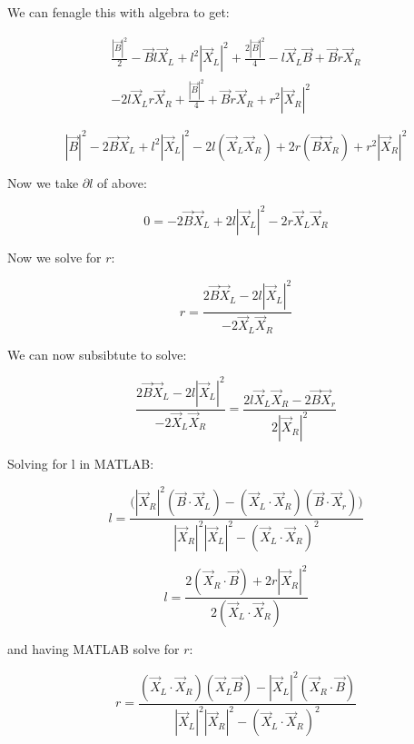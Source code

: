 \documentclass{article}
\begin{document}
\noindent We can fenagle this with algebra to get:

\begin{equation}
    \begin{split}
        \frac{|\vec{B}|^2}{2} - \vec{B}l\vec{X}_L + l^2|\vec{X}_L|^2+\frac{2|\vec{B}|^2}{4} - l\vec{X}_L\vec{B}+\vec{B}r\vec{X}_R \\
        - 2l\vec{X}_Lr\vec{X}_R+\frac{|\vec{B}|^2}{4}+\vec{B}r\vec{X}_R+r^2|\vec{X}_R|^2
    \end{split}
\end{equation}

\begin{equation}
    |\vec{B}|^2-2\vec{B}\vec{X}_L+l^2|\vec{X}_L|^2-2l(\vec{X}_L\vec{X}_R)+2r(\vec{B}\vec{X}_R)+r^2|\vec{X}_R|^2
\end{equation}

\noindent Now we take $\partial l$ of above:

\begin{equation}
    0 = -2\vec{B}\vec{X}_L+2l|\vec{X}_L|^2-2r\vec{X}_L\vec{X}_R
\end{equation}

\noindent Now we solve for $r$:

\begin{equation}
    r = \frac{2\vec{B}\vec{X}_L-2l|\vec{X}_L|^2}{-2\vec{X}_L\vec{X}_R}
\end{equation}

\noindent We can now subsibtute to solve:

\begin{equation}
    \frac{2\vec{B}\vec{X}_L-2l|\vec{X}_L|^2}{-2\vec{X}_L\vec{X}_R} = \frac{2l\vec{X}_L\vec{X}_R-2\vec{B}\vec{X}_r}{2|\vec{X}_R|^2}
\end{equation}

\noindent Solving for l in MATLAB:

\begin{equation}
    l = \frac{\bigl(|\vec{X}_R|^2(\vec{B}\cdot\vec{X}_L)-(\vec{X}_L\cdot\vec{X}_R)(\vec{B}\cdot\vec{X}_r)\bigr)}{|\vec{X}_R|^2|\vec{X}_L|^2-(\vec{X}_L\cdot\vec{X}_R)^2}
\end{equation}

\begin{equation}
    l = \frac{2(\vec{X}_R\cdot\vec{B})+2r|\vec{X}_R|^2}{2(\vec{X}_L\cdot\vec{X}_R)}
\end{equation}

\noindent and having MATLAB solve for $r$:

\begin{equation}
    r = \frac{(\vec{X}_L\cdot\vec{X}_R)(\vec{X}_L\vec{B})-|\vec{X}_L|^2(\vec{X}_R\cdot\vec{B})}{|\vec{X}_L|^2|\vec{X}_R|^2-(\vec{X}_L\cdot\vec{X}_R)^2}
\end{equation}
\end{document}
